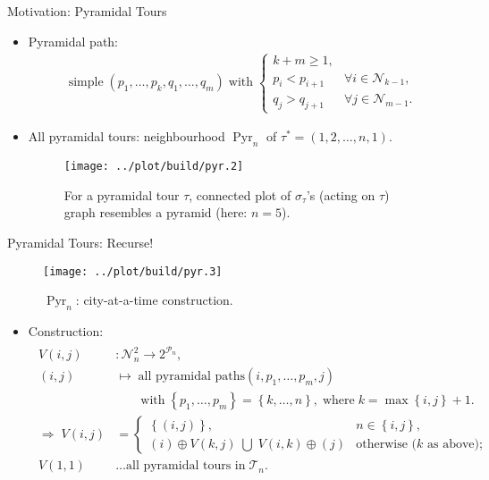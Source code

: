\documentclass[
  size=8pt,
  style=klope,
  paper=screen,
  pauseslide,
  nopagebreaks,
  hlsections,
  fleqn
]{powerdot}
\def\eqitspace{\vspace{-5mm}}
\begin{document}
\begin{slide}[toc=Pyramidal Tours]{Motivation: Pyramidal Tours}
\begin{itemize}
  \item
  Pyramidal path:
  \begin{align}
  \text{simple} \; \left( p_1, \ldots, p_k, q_1, \ldots, q_m \right) \; \text{with} \;
  \begin{cases}
  k+m \geq 1, & \\
  p_i < p_{i+1} \; & \forall i \in \mathcal{N}_{k-1},\\
  q_j > q_{j+1} \; & \forall j \in \mathcal{N}_{m-1}.
  \end{cases}
  \end{align}
  \item
  All pyramidal tours: neighbourhood $\operatorname{Pyr}_n$ of
  $\tau^\ast = \left(1, 2, \ldots, n, 1\right)$.
  \begin{figure}[H]
    \centering
    \texttt{[image: ../plot/build/pyr.2]}
    \caption{%
      For a pyramidal tour $\tau$,
      connected plot of $\sigma_\tau$'s
      (acting on $\tau$)
      graph resembles a pyramid (here: $n = 5$).
    }
  \end{figure}
\end{itemize}
\end{slide}

\begin{slide}[toc=]{Pyramidal Tours: Recurse!}
  \begin{figure}[H]
    \centering
    \texttt{[image: ../plot/build/pyr.3]}
    \caption{$\operatorname{Pyr}_n$: city-at-a-time construction.}
  \end{figure}
\begin{itemize}
  \item
    Construction:
  \begin{align}
    \begin{split}
    V\left(i,j\right) & : \mathcal{N}_n^2 \to 2^{\mathcal{P}_n}, \\
    \left(i,j\right) & \mapsto \; \text{all pyramidal paths} \left(i,p_1,\ldots,p_m,j\right)
    \\
    & \qquad \text{with} \; \left\{ p_1,\ldots,p_m \right\} = \left\{ k,\ldots,n \right\},
    \; \text{where} \; k = \max\left\{i,j\right\}+1.
    \\
    \Rightarrow \;
    V\left(i,j\right) & =
    \begin{cases}
      \left\{\left(i,j\right)\right\}, & n \in \left\{i,j\right\},
      \\
      \left(i\right) \oplus V\left(k,j\right)
      \;\bigcup\;
      V\left(i,k\right) \oplus \left(j\right)
      & \text{otherwise ($k$ as above)};
    \end{cases}
    \\
    V\left(1,1\right) & \ldots \text{all pyramidal tours in} \; \mathcal{T}_n.
    \end{split}
  \end{align}
\end{itemize}
\end{slide}
\end{document}
